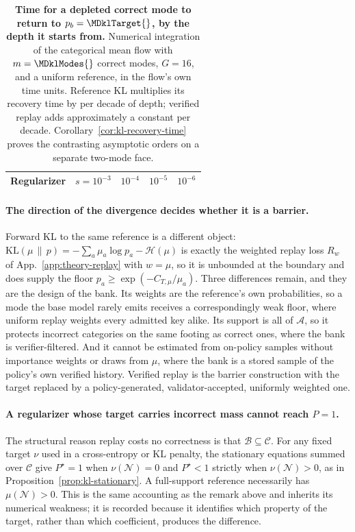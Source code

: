 \documentclass{article}
\newcommand{\1}{\mathbf 1}
\theoremstyle{remark}
\theoremstyle{definition}
\theoremstyle{plain}
\begin{document}
\begin{table}[t]
  \centering
  \caption{\textbf{Time for a depleted correct mode to return to
  $p_b=\MDklTarget{}$, by the depth it starts from.} Numerical integration of
  the categorical mean flow with $m=\MDklModes{}$ correct modes, $G=16$, and a
  uniform reference, in the flow's own time units. Reference KL multiplies its
  recovery time by \MDklDecadeKL{} per decade of depth; verified replay adds
  approximately a constant per decade. Corollary~\ref{cor:kl-recovery-time}
  proves the contrasting asymptotic orders on a separate two-mode face.}
  \label{tab:kl-recovery}
  \small
  \setlength{\tabcolsep}{6pt}
  \begin{tabular}{@{}lrrrr@{}}
    \toprule
    \textbf{Regularizer} & $s=10^{-3}$ & $10^{-4}$ & $10^{-5}$ & $10^{-6}$ \\
    \midrule
    
  \end{tabular}
\end{table}

\paragraph{The direction of the divergence decides whether it is a barrier.}
Forward KL to the same reference is a different object:
$\mathrm{KL}(\mu\,\|\,p)=-\sum_a\mu_a\log p_a-\mathcal H(\mu)$ is exactly the
weighted replay loss $R_w$ of
App.~\ref{app:theory-replay} with $w=\mu$, so it is unbounded at the
boundary and does supply the floor $p_a\ge\exp(-C_{T,\mu}/\mu_a)$. Three
differences remain, and they are the design of the bank. Its weights are the
reference's own probabilities, so a mode the base model rarely emits receives
a correspondingly weak floor, where uniform replay weights every admitted key
alike. Its support is all of $\mathcal A$, so it protects incorrect categories
on the same footing as correct ones, where the bank is verifier-filtered.
And it cannot be estimated from on-policy samples without importance weights or
draws from $\mu$, where the bank is a stored sample of the policy's own
verified history. Verified replay is the barrier construction with the target
replaced by a policy-generated, validator-accepted, uniformly weighted one.

\paragraph{A regularizer whose target carries incorrect mass cannot reach
$P=1$.} The structural reason replay costs no correctness is that
$\mathcal B\subseteq\mathcal C$. For any fixed target $\nu$ used in a
cross-entropy or KL penalty, the stationary equations summed over
$\mathcal C$ give $P^\star=1$ when $\nu(\mathcal N)=0$ and $P^\star<1$
strictly when $\nu(\mathcal N)>0$, as in
Proposition~\ref{prop:kl-stationary}. A full-support reference necessarily has
$\mu(\mathcal N)>0$. This is the same accounting as the remark above and
inherits its numerical weakness; it is recorded because it identifies which
property of the target, rather than which coefficient, produces the
difference.
\end{document}
